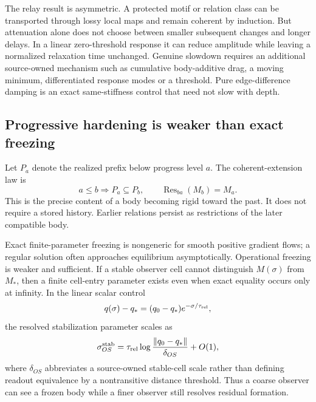 \documentclass[11pt]{article}
\begin{document}
The relay result is asymmetric.  A protected motif or relation class can be
transported through lossy local maps and remain coherent by induction.  But
attenuation alone does not choose between smaller subsequent changes and
longer delays.  In a linear zero-threshold response it can reduce amplitude
while leaving a normalized relaxation time unchanged.  Genuine slowdown
requires an additional source-owned mechanism such as cumulative body-additive
drag, a moving minimum, differentiated response modes or a threshold.  Pure
edge-difference damping is an exact same-stiffness control that need not slow
with depth.

\subsection{Progressive hardening is weaker than exact freezing}

Let \(P_a\) denote the realized prefix below progress level \(a\).  The
coherent-extension law is
\begin{equation}
 a\le b\Longrightarrow P_a\subseteq P_b,
 \qquad
 \operatorname{Res}_{ba}(M_b)=M_a.
 \label{eq:prefix-persistence}
\end{equation}
This is the precise content of a body becoming rigid toward the past.  It
does not require a stored history.  Earlier relations persist as restrictions
of the later compatible body.

Exact finite-parameter freezing is nongeneric for smooth positive gradient
flows; a regular solution often approaches equilibrium asymptotically.
Operational freezing is weaker and sufficient.  If a stable observer cell
cannot distinguish \(M(\sigma)\) from \(M_*\), then a finite cell-entry
parameter exists even when exact equality occurs only at infinity.  In the
linear scalar control
\begin{equation}
 q(\sigma)-q_*=(q_0-q_*)e^{-\sigma/\tau_{\rm rel}},
 \label{eq:linear-relaxation}
\end{equation}
the resolved stabilization parameter scales as
\begin{equation}
 \sigma_{OS}^{\rm stab}
 =\tau_{\rm rel}\log\frac{\|q_0-q_*\|}{\delta_{OS}}+O(1),
 \label{eq:resolution-freeze}
\end{equation}
where \(\delta_{OS}\) abbreviates a source-owned stable-cell scale rather
than defining readout equivalence by a nontransitive distance threshold.
Thus a coarse observer can see a frozen body while a finer observer still
resolves residual formation.
\end{document}
